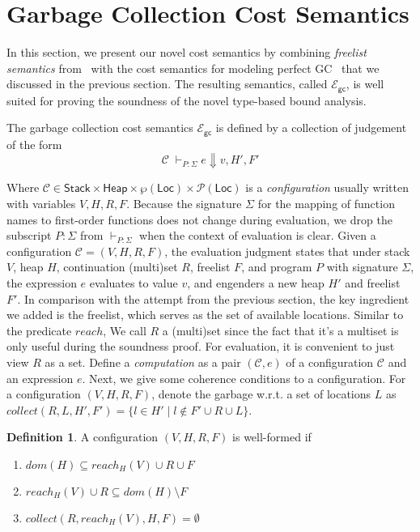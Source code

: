 \documentclass{easychair}
\newcommand{\ms}[1]{\ensuremath{\mathsf{#1}}}
\newcommand{\gcSem}{\ensuremath{\mathcal{E}_{\ms{gc}}}}
\theoremstyle{definition}
\newtheorem{definition}{Definition}
\begin{document}
\section{Garbage Collection Cost Semantics}
\label{sect:semantics}

In this section, we present our novel cost semantics by combining
\emph{freelist semantics} from~\cite{Hofmann:2003:SPH:604131.604148}
with the cost semantics for modeling perfect
GC~\cite{DBLP:journals/entcs/Minamide99} that we discussed in the
previous section. The resulting semantics, called \gcSem, is well suited for
proving the soundness of the novel type-based bound analysis.

The garbage collection cost semantics \gcSem{} is defined by a collection of judgement of the form
\[
\mathcal{C} \; \vdash_{P : \Sigma} e \Downarrow v, H', F'
\]

Where $\mathcal{C} \in \ms{Stack} \times \ms{Heap} \times
\wp(\ms{Loc}) \times \mathcal{P}(\ms{Loc})$ is a \emph{configuration}
usually written with variables $V,H,R,F$. 
Because the signature $\Sigma$ for the mapping of function names to first-order functions 
does not change during evaluation, we drop the subscript $P:\Sigma$ from $\vdash_{P:\Sigma}$ 
when the context of evaluation is clear. Given a configuration $\mathcal{C} = (V,H,R,F)$,
the evaluation judgment states that under stack $V$, heap $H$, continuation (multi)set $R$,
freelist $F$, and program $P$ with signature $\Sigma$, the expression $e$ evaluates to value $v$, 
and engenders a new heap $H'$ and freelist $F'$. In comparison with the attempt from 
the previous section, the key ingredient we added is the freelist, which serves 
as the set of available locations. Similar to the predicate $reach$, 
We call $R$ a (multi)set since the fact that 
it's a multiset is only useful during the soundness proof. For evaluation, it is 
convenient to just view $R$ as a set. Define a \emph{computation} as a pair
$(\mathcal{C},e)$ of a configuration $\mathcal{C}$ and an expression $e$.
Next, we give some coherence conditions to a configuration.
For a configuration $(V,H,R,F)$, denote the
garbage w.r.t. a set of locations $L$ 
as $collect(R,L,H',F') = \{l \in H' \mid l \notin F' \cup R \cup L\}$.

\begin{definition} A configuration $(V,H,R,F)$ is well-formed if 
	\begin{enumerate}
		\item $dom(H) \subseteq reach_H(V) \cup R \cup F$
		\item $reach_H(V) \cup R \subseteq dom(H) \setminus F$
		\item $collect(R,reach_H(V),H,F) = \emptyset$
	\end{enumerate}
\end{definition}
\end{document}
